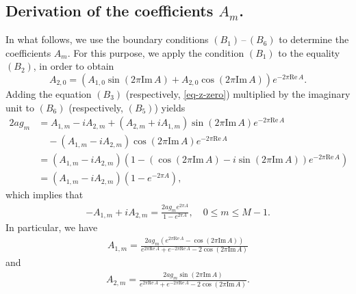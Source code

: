 \documentclass[11pt, letterpaper, reqno]{amsart}
\numberwithin{equation}{section}
\theoremstyle{definition}
\theoremstyle{plain}
\numberwithin{equation}{section}
\begin{document}
\subsection{Derivation of the coefficients $A_{m}$.} \label{sec-am} In what follows, we use the boundary conditions $(B_{1})$\,--\,$(B_{6})$ to determine the coefficients $A_{m}$. For this purpose, we apply the condition $(B_{1})$ to the equality $(B_{2})$, in order to obtain
\begin{equation}\label{eq-z-zero}
A_{2,0} = (A_{1,0}\sin\left(2\pi\mathrm{Im}\,A\right) + A_{2,0}\cos\left(2\pi\mathrm{Im}\,A\right))e^{-2\pi\mathrm{Re}\,A}.
\end{equation}
Adding the equation $(B_{3})$ (respectively, \eqref{eq-z-zero}) multiplied by the imaginary unit to $(B_{6})$ (respectively, $(B_{5})$) yields 
\begin{align*}
2ag_{m} & = A_{1,m}-iA_{2,m} + (A_{2,m}+iA_{1,m})\sin\left(2\pi\mathrm{Im}\,A\right)e^{-2\pi\mathrm{Re}\,A} \\
& \quad - (A_{1,m}-iA_{2,m})\cos(2\pi\mathrm{Im}\,A)e^{-2\pi\mathrm{Re}\,A} \\
& = (A_{1,m}-iA_{2,m})\left(1 - \left(\cos(2\pi\mathrm{Im}\,A) - i \sin\left(2\pi\mathrm{Im}\,A\right)\right)e^{-2\pi\mathrm{Re}\,A} \right) \\
& = (A_{1,m}-iA_{2,m})\left(1 - e^{-2\pi A}\right),
\end{align*}
which implies that 
\begin{align}\label{form-a}
-A_{1,m} + i A_{2,m} = \frac{2a g_{m} e^{2\pi A}}{1-e^{2\pi A}}, \quad 0\le m \le M-1.
\end{align}
In particular, we have
\begin{align}\label{from-a1}
A_{1,m} = \frac{2ag_{m}(e^{2\pi\mathrm{Re}\,A} - \cos(2\pi\mathrm{Im}\,A))}{e^{2\pi\mathrm{Re}\,A} + e^{-2\pi\mathrm{Re}\,A} - 2\cos(2\pi\mathrm{Im}\,A)}
\end{align}
and 
\begin{align}\label{from-a2}
A_{2,m} = \frac{2ag_{m}\sin(2\pi\mathrm{Im}\,A)}{e^{2\pi\mathrm{Re}\,A} + e^{-2\pi\mathrm{Re}\,A} - 2\cos(2\pi\mathrm{Im}\,A)}.
\end{align}
\end{document}
